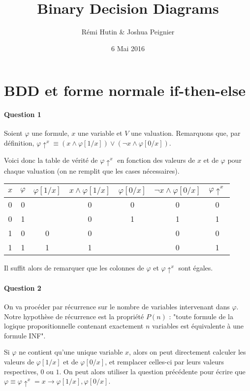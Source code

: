 \documentclass[a4paper,11pt]{article}
\title{Binary Decision Diagrams}
\author{Rémi Hutin \& Joshua Peignier}
\date{6 Mai 2016}
\begin{document}
\maketitle

	
	\section{BDD et forme normale if-then-else}

		\paragraph{Question 1}
		Soient $\varphi$ une formule, $x$ une variable et $V$ une valuation.\newline
		Remarquons que, par définition, $\varphi\uparrow^{x} \equiv (x \wedge \varphi[1/x]) \vee (\neg x \wedge \varphi[0/x])$.
		
		Voici donc la table de vérité de $\varphi\uparrow^{x}$ en fonction des valeurs de $x$ et de $\varphi$ pour chaque valuation (on ne remplit que les cases nécessaires).\newline
		
		\begin{tabular}{|c|c|c|c|c|c|c|}
		\hline
		$x$ & $\varphi$ & $\varphi[1/x]$ &  $x \wedge \varphi[1/x]$ & $\varphi[0/x]$ & $\neg x \wedge \varphi[0/x]$ & $\varphi\uparrow^{x}$ \\
		\hline
		0 & 0 &   & 0 & 0 & 0 & 0 \\
		\hline
		0 & 1 &   & 0 & 1 & 1 & 1 \\
		\hline
		1 & 0 & 0 & 0 &   & 0 & 0 \\
		\hline
		1 & 1 & 1 & 1 &   & 0 & 1 \\
		\hline
		\end{tabular}
		
		Il suffit alors de remarquer que les colonnes de $\varphi$ et $\varphi\uparrow^{x}$ sont égales.
		
		\paragraph{Question 2}
		On va procéder par récurrence sur le nombre de variables intervenant dans $\varphi$. Notre hypothèse de récurrence est la propriété $P(n)$ : "toute formule de la logique propositionnelle contenant exactement $n$ variables est équivalente à une formule INF".
	
		Si $\varphi$ ne contient qu'une unique variable $x$, alors on peut directement calculer les valeurs de $\varphi[1/x]$ et de $\varphi[0/x]$, et remplacer celles-ci par leurs valeurs respectives, $0$ ou $1$.
		On peut alors utiliser la question précédente pour écrire que $\varphi \equiv \varphi\uparrow^{x} = x \rightarrow \varphi[1/x],\varphi[0/x]$.
		
\end{document}
